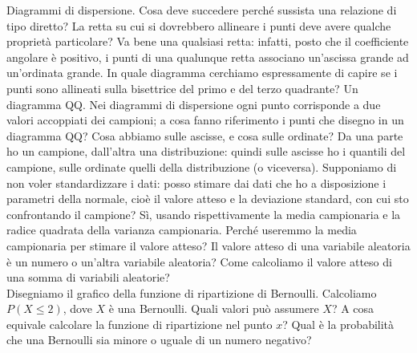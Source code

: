 \documentclass{article}
\begin{document}
    Diagrammi di dispersione. Cosa deve succedere perché sussista una relazione di tipo diretto? La retta su cui si dovrebbero allineare i punti deve avere qualche proprietà
    particolare? Va bene una qualsiasi retta: infatti, posto che il coefficiente angolare è positivo, i punti di una qualunque retta associano un'ascissa grande ad un'ordinata grande.
    In quale diagramma cerchiamo espressamente di capire se i punti sono allineati sulla bisettrice del primo e del terzo quadrante? Un diagramma QQ. Nei diagrammi di dispersione ogni
    punto corrisponde a due valori accoppiati dei campioni; a cosa fanno riferimento i punti che disegno in un diagramma QQ? Cosa abbiamo sulle ascisse, e cosa sulle ordinate? Da
    una parte ho un campione, dall'altra una distribuzione: quindi sulle ascisse ho i quantili del campione, sulle ordinate quelli della distribuzione (o viceversa). Supponiamo
    di non voler standardizzare i dati: posso stimare dai dati che ho a disposizione i parametri della normale, cioè il valore atteso e la deviazione standard, con cui sto
    confrontando il campione? Sì, usando rispettivamente la media campionaria e la radice quadrata della varianza campionaria. Perché useremmo la media campionaria per stimare il
    valore atteso? Il valore atteso di una variabile aleatoria è un numero o un'altra variabile aleatoria? Come calcoliamo il valore atteso di una somma di variabili aleatorie?
    \\
    Disegniamo il grafico della funzione di ripartizione di Bernoulli. Calcoliamo $ P ( X \leq 2 ) $, dove $ X $ è una Bernoulli. Quali valori può assumere $ X $? A cosa equivale
    calcolare la funzione di ripartizione nel punto $ x $? Qual è la probabilità che una Bernoulli sia minore o uguale di un numero negativo?
    
\end{document}
